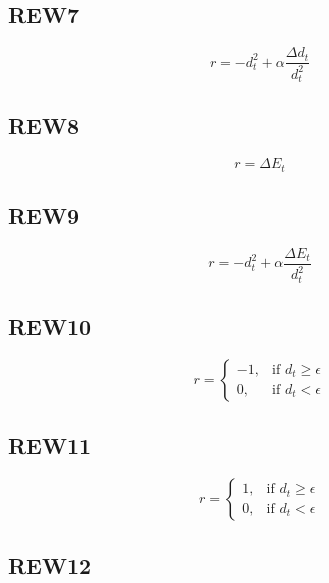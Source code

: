 \documentclass{article}
\begin{document}
\subsection*{REW7} 

\begin{equation}
r = - d_t^2 + \alpha \frac{\Delta d_t}{d_t^2}
\end{equation}

\subsection*{REW8} 

\begin{equation}
r = \Delta E_t
\end{equation}

\subsection*{REW9} 

\begin{equation}
r = - d_t^2 + \alpha \frac{\Delta E_t}{d_t^2}
\end{equation}

\subsection*{REW10} 

\begin{equation}
r = \begin{cases}
    -1, & \text{if $d_t \geq \epsilon $}\\
    0, & \text{if $d_t < \epsilon $}
  \end{cases}
\end{equation}

\subsection*{REW11}

\begin{equation}
r = \begin{cases}
    1, & \text{if $d_t \geq \epsilon $}\\
    0, & \text{if  $d_t < \epsilon $}
  \end{cases}
\end{equation}


\subsection*{REW12} 
\end{document}
